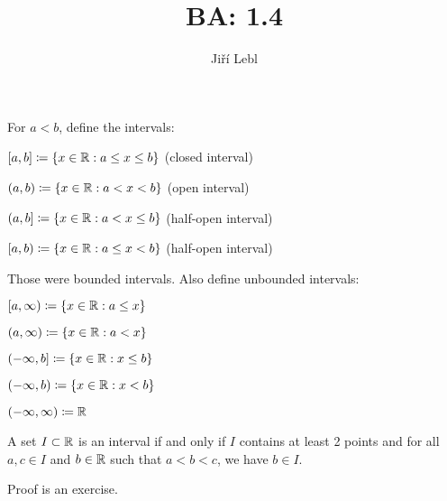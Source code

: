 \documentclass[10pt,aspectratio=169]{beamer}
\author{Ji\v{r}\'i Lebl}
\institute[OSU]{%
Departemento pri Matematiko de Oklahoma {\^S}tata Universitato}
\title{BA: 1.4}
\date{}
\begin{document}
\begin{frame}
\titlepage
\end{frame}

\begin{frame}
For $a < b$, define the intervals:

\medskip
\pause

$[a,b] \coloneqq \{ x \in {\mathbb{R}} : a \leq x \leq b \}$
\quad (closed interval)

\pause

$(a,b) \coloneqq \{ x \in {\mathbb{R}} : a < x < b \}$
\quad (open interval)

\pause

$(a,b] \coloneqq \{ x \in {\mathbb{R}} : a < x \leq b \}$
\quad (half-open interval)

\pause

$[a,b) \coloneqq \{ x \in {\mathbb{R}} : a \leq x < b \}$
\quad (half-open interval)

\pause
\medskip

Those were bounded intervals.  Also define unbounded intervals:

\medskip
\pause

$[a,\infty) \coloneqq \{ x \in {\mathbb{R}} : a \leq x \}$

\pause

$(a,\infty) \coloneqq \{ x \in {\mathbb{R}} : a < x \}$

\pause

$(-\infty,b] \coloneqq \{ x \in {\mathbb{R}} : x \leq b \}$

\pause

$(-\infty,b) \coloneqq \{ x \in {\mathbb{R}} : x < b \}$

\pause

$(-\infty,\infty) \coloneqq {\mathbb{R}}$

\pause

\begin{proposition}
A set $I \subset {\mathbb{R}}$ is an interval if and only if
$I$ contains at least 2 points and
for all $a,c \in I$ and $b \in {\mathbb{R}}$ such that $a < b < c$, we have $b \in I$.
\end{proposition}

\pause

Proof is an exercise.

\end{frame}
\end{document}
